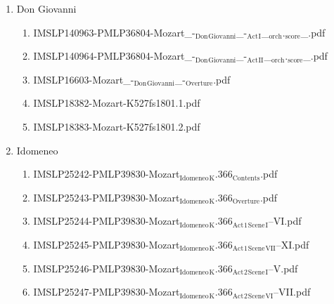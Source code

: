 \documentclass[11pt]{article}
\begin{document}
\begin{enumerate}
\begin{enumerate}
\item Don Giovanni
\label{sec-1-1-1-1-44-49-3-6}
\begin{enumerate}
\item IMSLP140963-PMLP36804-Mozart\_-$_{\text{Don}}$$_{\text{Giovanni}}$\_-$_{\text{Act}}$$_{\text{I}}$\_$_{\text{orch}}$.$_{\text{score}}$\_.pdf
\label{sec-1-1-1-1-44-49-3-6-1}

\item IMSLP140964-PMLP36804-Mozart\_-$_{\text{Don}}$$_{\text{Giovanni}}$\_-$_{\text{Act}}$$_{\text{II}}$\_$_{\text{orch}}$.$_{\text{score}}$\_.pdf
\label{sec-1-1-1-1-44-49-3-6-2}

\item IMSLP16603-Mozart\_-$_{\text{Don}}$$_{\text{Giovanni}}$\_-$_{\text{Overture}}$.pdf
\label{sec-1-1-1-1-44-49-3-6-3}

\item IMSLP18382-Mozart-K527fs1801.1.pdf
\label{sec-1-1-1-1-44-49-3-6-4}

\item IMSLP18383-Mozart-K527fs1801.2.pdf
\label{sec-1-1-1-1-44-49-3-6-5}
\end{enumerate}

\item Idomeneo
\label{sec-1-1-1-1-44-49-3-7}
\begin{enumerate}
\item IMSLP25242-PMLP39830-Mozart$_{\text{Idomeneo}}$$_{\text{K}}$.366$_{\text{Contents}}$.pdf
\label{sec-1-1-1-1-44-49-3-7-1}

\item IMSLP25243-PMLP39830-Mozart$_{\text{Idomeneo}}$$_{\text{K}}$.366$_{\text{Overture}}$.pdf
\label{sec-1-1-1-1-44-49-3-7-2}

\item IMSLP25244-PMLP39830-Mozart$_{\text{Idomeneo}}$$_{\text{K}}$.366$_{\text{Act}}$$_{\text{1}}$$_{\text{Scene}}$$_{\text{I}}$--VI.pdf
\label{sec-1-1-1-1-44-49-3-7-3}

\item IMSLP25245-PMLP39830-Mozart$_{\text{Idomeneo}}$$_{\text{K}}$.366$_{\text{Act}}$$_{\text{1}}$$_{\text{Scene}}$$_{\text{VII}}$--XI.pdf
\label{sec-1-1-1-1-44-49-3-7-4}

\item IMSLP25246-PMLP39830-Mozart$_{\text{Idomeneo}}$$_{\text{K}}$.366$_{\text{Act}}$$_{\text{2}}$$_{\text{Scene}}$$_{\text{I}}$--V.pdf
\label{sec-1-1-1-1-44-49-3-7-5}

\item IMSLP25247-PMLP39830-Mozart$_{\text{Idomeneo}}$$_{\text{K}}$.366$_{\text{Act}}$$_{\text{2}}$$_{\text{Scene}}$$_{\text{VI}}$--VII.pdf
\label{sec-1-1-1-1-44-49-3-7-6}


\end{enumerate}
\end{enumerate}
\end{enumerate}
\end{document}
